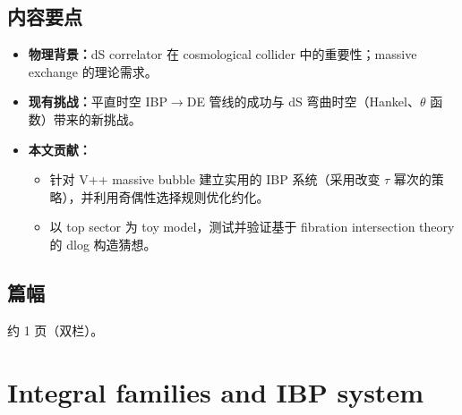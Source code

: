 \documentclass[UTF8,a4paper,11pt]{ctexart}
\begin{document}
\subsection*{内容要点}
\begin{itemize}
  \item \textbf{物理背景：}dS correlator 在 cosmological collider 中的重要性；massive exchange 的理论需求。
  \item \textbf{现有挑战：}平直时空 IBP$\to$DE 管线的成功与 dS 弯曲时空（Hankel、$\theta$ 函数）带来的新挑战。
  \item \textbf{本文贡献：}
    \begin{itemize}
        \item 针对 V++ massive bubble 建立实用的 IBP 系统（采用改变 $\tau$ 幂次的策略），并利用奇偶性选择规则优化约化。
        \item 以 top sector 为 toy model，测试并验证基于 fibration intersection theory 的 dlog 构造猜想。
    \end{itemize}
\end{itemize}
\subsection*{篇幅}
约 1 页（双栏）。

\section{Integral families and IBP system}
\end{document}
